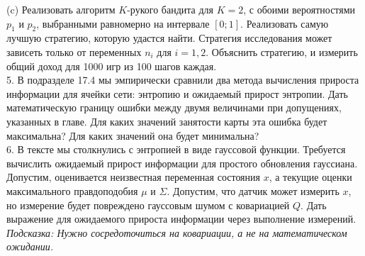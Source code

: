 \documentclass[10pt,a4paper]{article}
\begin{document}
(c)	Реализовать алгоритм $K$-рукого бандита для $K = 2$, с обоими вероятностями $p_1$ и $p_2$, выбранными равномерно на интервале $[0; 1]$. Реализовать самую лучшую стратегию, которую удастся найти. Стратегия исследования может зависеть только от переменных $n_i$ для $i = 1, 2$. Объяснить стратегию, и измерить общий доход для 1000 игр из 100 шагов каждая.\\

5.	В подразделе 17.4 мы эмпирически сравнили два метода вычисления прироста информации для ячейки сети: энтропию и ожидаемый прирост энтропии. Дать математическую границу ошибки между двумя величинами при допущениях, указанных в главе. Для каких значений занятости карты эта ошибка будет максимальна? Для каких значений она будет минимальна?\\

6.	В тексте мы столкнулись с энтропией в виде гауссовой функции. Требуется вычислить ожидаемый прирост информации для простого обновления гауссиана. Допустим, оценивается неизвестная переменная состояния $x$, а текущие оценки максимального правдоподобия $\mu$ и $\varSigma$. Допустим, что датчик может измерить $x$, но измерение будет повреждено гауссовым шумом с ковариацией $Q$. Дать выражение для ожидаемого прироста информации через выполнение измерений. \textit{Подсказка: Нужно сосредоточиться на ковариации, а не на математическом ожидании.}\\



 
\end{document}
